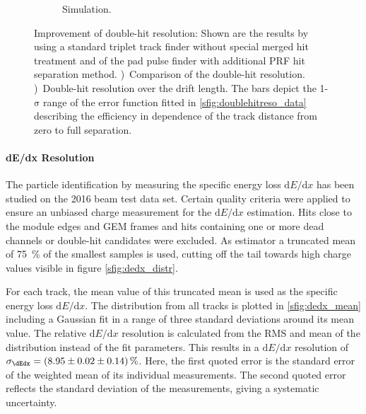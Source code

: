 \begin{figure}[tbhp!]
\begin{subfigure}[b]{0.5\textwidth}
\caption{Simulation.}
\label{sfig:DHR_vs_drift_data}
\end{subfigure}
\caption{\small Improvement of double-hit resolution: Shown are the results by using a standard triplet track finder without special merged hit treatment and of the pad pulse finder with additional PRF hit separation method. 
\protect{})~Comparison of the double-hit resolution.
\protect{})~Double-hit resolution over the drift length. The bars depict the 1-$\mathrm{\sigma}$ range of the error function fitted in \protect\ref{sfig:doublehitreso_data} describing the efficiency in dependence of the track distance from zero to full separation.
}
\label{fig:doublehitreso}
\end{figure}

\paragraph{dE/dx Resolution}

The particle identification by measuring the specific energy loss \ensuremath{\mathrm{d}E/\mathrm{d}x} has been studied on the 2016 beam test data set. 
Certain quality criteria were applied to ensure an unbiased charge measurement for the \ensuremath{\mathrm{d}E/\mathrm{d}x} estimation.
Hits close to the module edges and GEM frames and hits containing one or more dead channels or double-hit candidates were excluded.
As estimator a truncated mean of \SI{75}{\percent} of the smallest samples is used, cutting off the tail towards high charge values visible in figure \ref{sfig:dedx_distr}.

For each track, the mean value of this truncated mean is used as the specific energy loss \ensuremath{\mathrm{d}E/\mathrm{d}x}.
The distribution from all tracks is plotted in \ref{sfig:dedx_mean} including a Gaussian fit in a range of three standard deviations around its mean value.
The relative \ensuremath{\mathrm{d}E/\mathrm{d}x} resolution is calculated from the RMS and mean of the distribution instead of the fit parameters.
This results in a \ensuremath{\mathrm{d}E/\mathrm{d}x} resolution of $\sigma_{\dEdx} = \SI[parse-numbers=false]{(8.95\pm0.02\pm0.14)}{\percent}$. 
Here, the first quoted error is the standard error of the weighted mean of its individual measurements.
The second quoted error reflects the standard deviation of the measurements, giving a systematic uncertainty.

